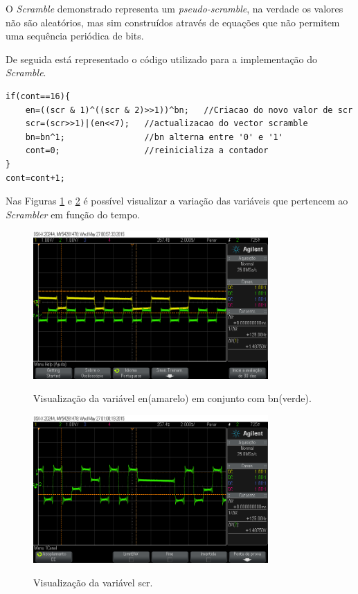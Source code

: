 \documentclass[11pt]{article}
\numberwithin{equation}{section}
\begin{document}
O \textit{Scramble} demonstrado representa um \textit{pseudo-scramble}, na verdade os valores não são aleatórios, mas sim construídos através de equações que não permitem uma sequência periódica de bits.

De seguida está representado o código utilizado para a implementação do \textit{Scramble}.

\begin{lstlisting}
if(cont==16){
	en=((scr & 1)^((scr & 2)>>1))^bn;   //Criacao do novo valor de scr
	scr=(scr>>1)|(en<<7);	//actualizacao do vector scramble
	bn=bn^1;				//bn alterna entre '0' e '1'
	cont=0;					//reinicializa a contador
}
cont=cont+1;
\end{lstlisting}

Nas Figuras \ref{fig:en_bn} e \ref{fig:scr} é possível visualizar a variação das variáveis que pertencem ao \textit{Scrambler} em função do tempo.

\begin{figure}[H]
	\centering
	\includegraphics[width=0.8\textwidth]{./en_bn}~\\
	\caption{Visualização da variável en(amarelo) em conjunto com bn(verde).}
	\label{fig:en_bn}
\end{figure}

\begin{figure}[H]
	\centering
	\includegraphics[width=0.8\textwidth]{./scr}~\\
	\caption{Visualização da variável scr.}
	\label{fig:scr}
\end{figure}
\end{document}
